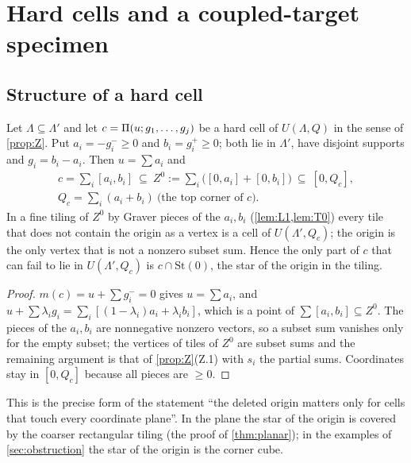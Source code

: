 \section{Hard cells and a coupled-target specimen}\label{sec:hard}

\subsection{Structure of a hard cell}
\begin{proposition}\label{prop:H1}
Let $\Lambda\subseteq\Lambda'$ and let $c=\Pi(u;g_1,\dots,g_j)$ be a hard cell of $U(\Lambda,Q)$ in the sense of \cref{prop:Z}. Put $a_i=-g_i^-\ge0$ and $b_i=g_i^+\ge0$; both lie in $\Lambda'$, have disjoint supports and $g_i=b_i-a_i$. Then $u=\sum a_i$ and
\[
\begin{gathered}c=\sum_i[a_i,b_i]\ \subseteq\ Z^0:=\sum_i\bigl([0,a_i]+[0,b_i]\bigr)\ \subseteq\ [0,Q_c],\\ Q_c=\sum_i(a_i+b_i)\ \text{(the top corner of $c$)}.\end{gathered}
\]
In a fine tiling of $Z^0$ by Graver pieces of the $a_i,b_i$ (\cref{lem:L1,lem:T0}) every tile that does not contain the origin as a vertex is a cell of $U(\Lambda',Q_c)$; the origin is the only vertex that is not a nonzero subset sum. Hence the only part of $c$ that can fail to lie in $U(\Lambda',Q_c)$ is $c\cap\mathrm{St}(0)$, the star of the origin in the tiling.
\end{proposition}
\begin{proof}
$m(c)=u+\sum g_i^-=0$ gives $u=\sum a_i$, and $u+\sum\lambda_ig_i=\sum_i[(1-\lambda_i)a_i+\lambda_ib_i]$, which is a point of $\sum[a_i,b_i]\subseteq Z^0$. The pieces of the $a_i,b_i$ are nonnegative nonzero vectors, so a subset sum vanishes only for the empty subset; the vertices of tiles of $Z^0$ are subset sums and the remaining argument is that of \cref{prop:Z}(Z.1) with $s_i$ the partial sums. Coordinates stay in $[0,Q_c]$ because all pieces are $\ge0$. \qedhere
\end{proof}
This is the precise form of the statement ``the deleted origin matters only for cells that touch every coordinate plane''. In the plane the star of the origin is covered by the coarser rectangular tiling (the proof of \cref{thm:planar}); in the examples of \cref{sec:obstruction} the star of the origin is the corner cube.

